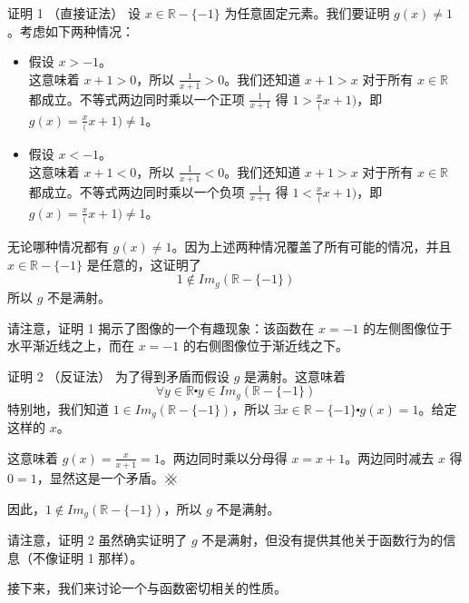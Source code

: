 \begin{example}
    \begin{proofs}{证明 1 （直接证法）}
        设 $x \in \mathbb{R} - \{-1\}$ 为任意固定元素。我们要证明 $g(x) \ne 1$。考虑如下两种情况：
        \begin{itemize}
            \item 假设 $x > -1$。\\
                  这意味着 $x+1>0$，所以 $\frac{1}{x+1}>0$。我们还知道 $x+1>x$ 对于所有 $x \in \mathbb{R}$ 都成立。不等式两边同时乘以一个正项 $\frac{1}{x+1}$ 得 $1 > \frac{x}(x+1)$，即 $g(x) = \frac{x}(x+1) \ne 1$。
            \item 假设 $x < -1$。\\
                  这意味着 $x+1<0$，所以 $\frac{1}{x+1}<0$。我们还知道 $x+1>x$ 对于所有 $x \in \mathbb{R}$ 都成立。不等式两边同时乘以一个负项 $\frac{1}{x+1}$ 得 $1 < \frac{x}(x+1)$，即 $g(x) =  \frac{x}(x+1) \ne 1$。
        \end{itemize}
        无论哪种情况都有 $g(x) \ne 1$。因为上述两种情况覆盖了所有可能的情况，并且 $x \in \mathbb{R} - \{-1\}$ 是任意的，这证明了
        \[1 \notin Im_g(\mathbb{R} - \{-1\})\]
        所以 $g$ 不是满射。
    \end{proofs}

    请注意，证明 1 揭示了图像的一个有趣现象：该函数在 $x = -1$ 的左侧图像位于水平渐近线之上，而在 $x = -1$ 的右侧图像位于渐近线之下。

    \begin{proofs}{证明 2 （反证法）}
        为了得到矛盾而假设 $g$ 是满射。这意味着
        \[\forall y \in \mathbb{R} \centerdot y \in Im_g(\mathbb{R} - \{-1\})\]
        特别地，我们知道 $1 \in Im_g(\mathbb{R} - \{-1\})$，所以 $\exists x \in \mathbb{R} - \{-1\} \centerdot g(x) = 1$。给定这样的 $x$。

        这意味着 $g(x) = \frac{x}{x+1} = 1$。两边同时乘以分母得 $x = x + 1$。两边同时减去 $x$ 得 $0 = 1$，显然这是一个矛盾。$
            \hashx$

        因此，$1 \notin Im_g(\mathbb{R} - \{-1\})$，所以 $g$ 不是满射。
    \end{proofs}

    请注意，证明 2 虽然确实证明了 $g$ 不是满射，但没有提供其他关于函数行为的信息（不像证明 1 那样）。

    接下来，我们来讨论一个与函数密切相关的性质。
\end{example}